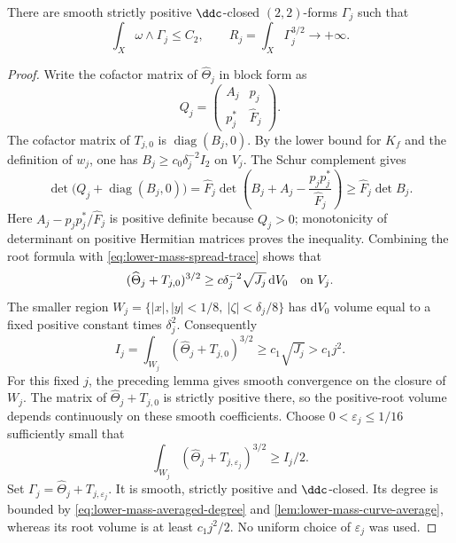 \begin{lemma}\label{lem:lower-mass-unbounded-root}
There are smooth strictly positive $\ddc$-closed $(2,2)$-forms $\Gamma_j$ such that
\[
 \int_X\omega\wedge\Gamma_j\leq C_2,\qquad
 R_j=\int_X\Gamma_j^{3/2}\longrightarrow+\infty.
\]
\end{lemma}
\begin{proof}
Write the cofactor matrix of $\widehat\Theta_j$ in block form as
\[
 Q_j=\begin{pmatrix}A_j&p_j\\p_j^*&\widehat F_j\end{pmatrix}.
\]
The cofactor matrix of $T_{j,0}$ is $\operatorname{diag}(B_j,0)$. By the lower bound for $K_f$ and the definition of $w_j$, one has $B_j\geq c_0\delta_j^{-2}I_2$ on $V_j$. The Schur complement gives
\[
 \det\bigl(Q_j+\operatorname{diag}(B_j,0)\bigr)
 =\widehat F_j\det\left(B_j+A_j-
             \frac{p_jp_j^*}{\widehat F_j}\right)
 \geq\widehat F_j\det B_j.
\]
Here $A_j-p_jp_j^*/\widehat F_j$ is positive definite because $Q_j>0$; monotonicity of determinant on positive Hermitian matrices proves the inequality. Combining the root formula with \eqref{eq:lower-mass-spread-trace} shows that
\[
 (\widehat\Theta_j+T_{j,0})^{3/2}
       \geq c\delta_j^{-2}\sqrt{J_j}\,\mathrm{d}V_0
       \quad\hbox{on }V_j.
\]
The smaller region $W_j=\{|x|,|y|<1/8,\ |\zeta|<\delta_j/8\}$ has $\mathrm{d}V_0$ volume equal to a fixed positive constant times $\delta_j^2$. Consequently
\[
 I_j=\int_{W_j}(\widehat\Theta_j+T_{j,0})^{3/2}
       \geq c_1\sqrt{J_j}>c_1j^2.
\]
For this fixed $j$, the preceding lemma gives smooth convergence on the closure of $W_j$. The matrix of $\widehat\Theta_j+T_{j,0}$ is strictly positive there, so the positive-root volume depends continuously on these smooth coefficients. Choose $0<\varepsilon_j\leq1/16$ sufficiently small that
\[
 \int_{W_j}(\widehat\Theta_j+T_{j,\varepsilon_j})^{3/2}
       \geq I_j/2.
\]
Set $\Gamma_j=\widehat\Theta_j+T_{j,\varepsilon_j}$. It is smooth, strictly positive and $\ddc$-closed. Its degree is bounded by \eqref{eq:lower-mass-averaged-degree} and \cref{lem:lower-mass-curve-average}, whereas its root volume is at least $c_1j^2/2$. No uniform choice of $\varepsilon_j$ was used.
\end{proof}


